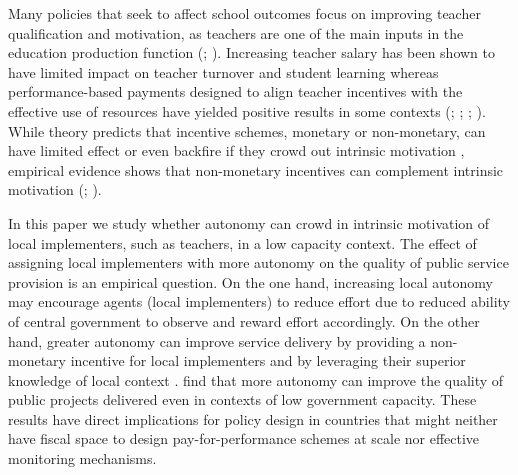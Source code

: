 \documentclass[11pt,a4paper]{article}
\begin{document}

Many policies that seek to affect school outcomes focus on improving teacher qualification and motivation, as teachers are one of the main inputs in the education production function (\citealp{hanushek2008role}; \citealp{chetty2014measuringI, chetty2014measuringII}). Increasing teacher salary has been shown to have limited impact on teacher turnover \citep{berlinski2020teacher} and student learning \citep{de2018double} whereas performance-based payments designed to align teacher incentives with the effective use of resources have yielded positive results in some contexts (\citealp{lavy2009performance}; \citealp{muralidharan2011teacher}; \citealp{duflo2012incentives}; \citealp{mbiti2019inputs}). While theory predicts that incentive schemes, monetary or non-monetary, can have limited effect or even backfire if they crowd out intrinsic motivation \citep{benabou2003intrinsic, benabou2006incentives}, empirical evidence shows that non-monetary incentives can complement intrinsic motivation (\citealp{bowles2012economic}; \citealp{ashraf2014no}).


In this paper we study whether autonomy can crowd in intrinsic motivation of local implementers, such as teachers, in a low capacity context. The effect of assigning local implementers with more autonomy on the quality of public service provision is an empirical question. On the one hand, increasing local autonomy may encourage agents (local implementers) to reduce effort due to reduced ability of central government to observe and reward effort accordingly. On the other hand, greater autonomy can improve service delivery by providing a non-monetary incentive for local implementers and by leveraging their superior knowledge of local context \citep{rogger2018hierarchy}. \cite{rasul2018managementand} find that more autonomy can improve the quality of public projects delivered even in contexts of low government capacity. These results have direct implications for policy design in countries that might neither have fiscal space to design pay-for-performance schemes at scale nor effective monitoring mechanisms.

\end{document}
